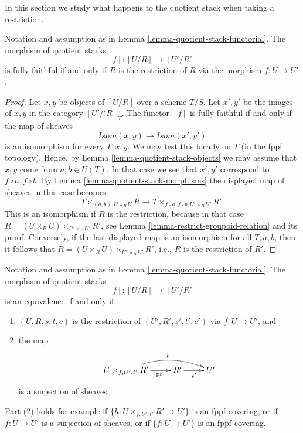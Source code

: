 \noindent
In this section we study what happens to the quotient stack
when taking a restriction.

\begin{lemma}
\label{lemma-quotient-stack-restrict}
Notation and assumption as in
Lemma \ref{lemma-quotient-stack-functorial}.
The morphism of quotient stacks
$$
[f] : [U/R] \longrightarrow [U'/R']
$$
is fully faithful if and only if $R$ is the restriction of
$R$ via the morphism $f : U \to U'$.
\end{lemma}

\begin{proof}
Let $x, y$ be objects of $[U/R]$ over a scheme $T/S$.
Let $x', y'$ be the images of $x, y$ in the category $[U'/'R]_T$.
The functor $[f]$ is fully faithful if and only if the map of sheaves
$$
\mathit{Isom}(x, y) \longrightarrow \mathit{Isom}(x', y')
$$
is an isomorphism for every $T, x, y$. We may test this locally on $T$
(in the fppf topology). Hence, by
Lemma \ref{lemma-quotient-stack-objects}
we may assume that $x, y$ come from $a, b \in U(T)$.
In that case we see that $x', y'$ correspond to $f \circ a, f \circ b$. By
Lemma \ref{lemma-quotient-stack-morphisms}
the displayed map of sheaves in this case becomes
$$
T \times_{(a, b), U \times_B U} R
\longrightarrow
T \times_{f \circ a, f \circ b, U' \times_B U'} R'.
$$
This is an isomorphism if $R$ is the restriction, because in that case
$R = (U \times_B U) \times_{U' \times_B U'} R'$, see
Lemma \ref{lemma-restrict-groupoid-relation}
and its proof. Conversely, if the last displayed map is an isomorphism
for all $T, a, b$, then it follows that
$R = (U \times_B U) \times_{U' \times_B U'} R'$, i.e.,
$R$ is the restriction of $R'$.
\end{proof}

\begin{lemma}
\label{lemma-quotient-stack-restrict-equivalence}
Notation and assumption as in
Lemma \ref{lemma-quotient-stack-functorial}.
The morphism of quotient stacks
$$
[f] : [U/R] \longrightarrow [U'/R']
$$
is an equivalence if and only if
\begin{enumerate}
\item $(U, R, s, t, c)$ is the restriction of $(U', R', s', t', c')$
via $f : U \to U'$, and
\item the map
$$
\xymatrix{
U \times_{f, U', t'} R' \ar[r]_-{\text{pr}_1} \ar@/^3ex/[rr]^h
& R' \ar[r]_{s'} & U'
}
$$
is a surjection of sheaves.
\end{enumerate}
Part (2) holds for example if $\{h : U \times_{f, U', t'} R' \to U'\}$
is an fppf covering, or if $f : U \to U'$ is a surjection of sheaves, or if
$\{f : U \to U'\}$ is an fppf covering.
\end{lemma}

